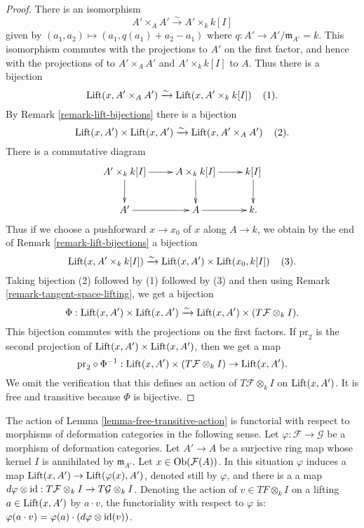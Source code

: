 \begin{proof}
There is an isomorphism
\[ A' \times_{A} A' \xrightarrow{\sim} A' \times_{k} k[I] \]
given by $(a_1,a_2) \mapsto (a_1, q(a_1) + a_2 - a_1)$ where $q: A' \rightarrow 
A'/\mathfrak{m}_{A'} = k$.  This isomorphism commutes with the projections to 
$A'$ on the first factor, and hence with the projections of to $A' \times_{A} 
A'$ and $A' \times_{k} k[I]$ to $A$. Thus there is a bijection
\[ 
\textnormal{Lift}(x, A' \times_{A} A') \xrightarrow{\sim} \textnormal{Lift}(x, 
A' \times_{k} k[I])  \hspace{4 mm} (1).\]
By Remark \ref{remark-lift-bijections} there is a bijection
\[ 
\textnormal{Lift}(x,A') \times \textnormal{Lift}(x,A') \xrightarrow{\sim} 
\textnormal{Lift}(x, A' \times_{A} A') \hspace{4 mm} (2).\]
There is a commutative diagram
\[
\xymatrix{
A' \times_{k} k[I] \ar[r] \ar[d] & A \times_{k} k[I] \ar[r] \ar[d] & k[I] 
\ar[d] \\
A' \ar[r] & A \ar[r] & k.
}
\]
Thus if we choose a pushforward $x \rightarrow x_0$ of $x$ along $A \rightarrow 
k$, we obtain by the end of Remark \ref{remark-lift-bijections} a bijection
\[
\textnormal{Lift}(x, A' \times_{k} k[I]) \xrightarrow{\sim} 
\textnormal{Lift}(x,A') \times \textnormal{Lift}(x_0,k[I]) \hspace{4 mm} (3).
\]
Taking bijection (2) followed by (1) followed by (3) and then using Remark 
\ref{remark-tangent-space-lifting}, we get a bijection
\[ \Phi: \textnormal{Lift}(x,A') \times \textnormal{Lift}(x,A') 
\xrightarrow{\sim} \textnormal{Lift}(x,A') \times (T\mathcal F \otimes_{k} I). 
\]
This bijection commutes with the projections on the first factors. If 
$\text{pr}_2$ is the second projection of $\textnormal{Lift}(x,A') \times 
\textnormal{Lift}(x,A')$, then we get a map
\[ \text{pr}_2 \circ \Phi^{-1}: \textnormal{Lift}(x,A') \times (T\mathcal F 
\otimes_{k} I) \rightarrow \textnormal{Lift}(x,A').\]
We omit the verification that this defines an action of $T\mathcal F 
\otimes_{k} I$ on $\textnormal{Lift}(x,A')$.  It is free and transitive because 
$\Phi$ is bijective.
\end{proof} 

\begin{remark}
\label{remark-free-transitive-action-functorial}
The action of Lemma \ref{lemma-free-transitive-action} is functorial with 
respect to morphisms of deformation categories in the following sense.  Let 
$\varphi: \mathcal F \rightarrow \mathcal G$ be a morphism of deformation 
categories.  Let $A' \rightarrow A$ be a surjective ring map whose kernel $I$ 
is annihilated by $\mathfrak{m}_{A'}$. Let $x \in \textnormal{Ob}(\mathcal 
F(A))$.  In this situation $\varphi$ induces a map $\textnormal{Lift}(x, A') 
\rightarrow \textnormal{Lift}(\varphi(x),A')$, denoted still by $\varphi$, and 
there is a a map $d\varphi \otimes \textnormal{id}: T\mathcal F \otimes_{k} I 
\rightarrow T\mathcal G \otimes_{k} I$. Denoting the action of $v \in TF 
\otimes_{k} I$ on a lifting $a \in \textnormal{Lift}(x,A')$ by $a \cdot v$, the 
functoriality with respect to $\varphi$ is: $\varphi(a \cdot v) = \varphi(a) 
\cdot (d\varphi \otimes \textnormal{id}(v))$.
\end{remark}




